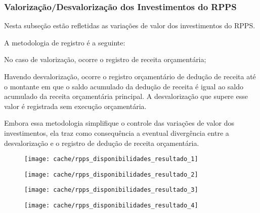 
\subsubsection[Resultado dos Investimentos]{Valorização/Desvalorização dos Investimentos do RPPS}

Nesta subseção estão refletidas as variações de valor dos investimentos do RPPS.

A metodologia de registro é a seguinte:

No caso de valorização, ocorre o registro de receita orçamentária;

Havendo desvalorização, ocorre o registro orçamentário de dedução de receita até o montante em que o saldo acumulado da dedução de receita é igual ao saldo acumulado da receita orçamentária principal. A desvalorização que supere esse valor é registrada sem execução orçamentária.

Embora essa metodologia simplifique o controle das variações de valor dos investimentos, ela traz como consequência a eventual divergência entre a desvalorização e o registro de dedução de receita orçamentária.





\begin{figure}[H]
\center
\texttt{[image: cache/rpps\_disponibilidades\_resultado\_1]}
\end{figure}

\begin{figure}[H]
\center
\texttt{[image: cache/rpps\_disponibilidades\_resultado\_2]}
\end{figure}

\begin{figure}[H]
\center
\texttt{[image: cache/rpps\_disponibilidades\_resultado\_3]}
\end{figure}

\begin{figure}[H]
\center
\texttt{[image: cache/rpps\_disponibilidades\_resultado\_4]}
\end{figure}